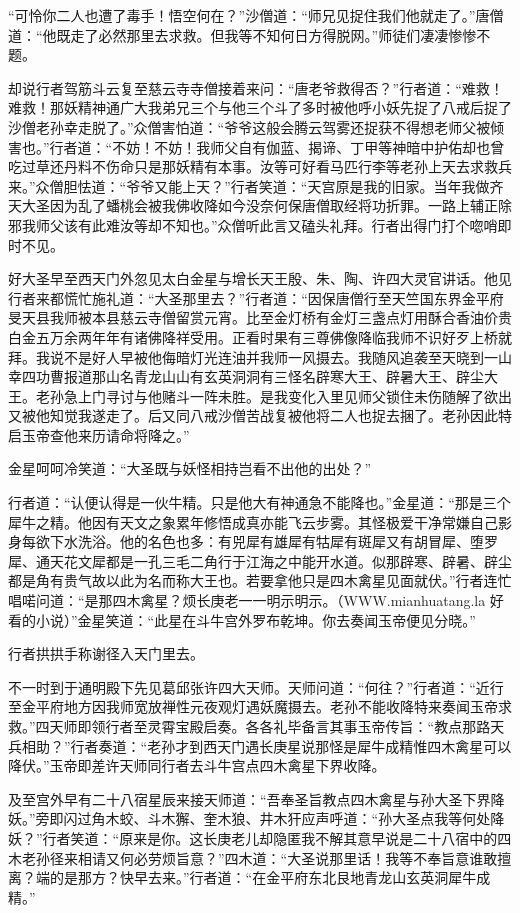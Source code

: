 \documentclass[12pt,UTF8]{ctexbook}
\begin{document}
{	“可怜你二人也遭了毒手！悟空何在？”沙僧道：“师兄见捉住我们他就走了。”唐僧道：“他既走了必然那里去求救。但我等不知何日方得脱网。”师徒们凄凄惨惨不题。
	
	却说行者驾筋斗云复至慈云寺寺僧接着来问：“唐老爷救得否？”行者道：“难救！难救！那妖精神通广大我弟兄三个与他三个斗了多时被他呼小妖先捉了八戒后捉了沙僧老孙幸走脱了。”众僧害怕道：“爷爷这般会腾云驾雾还捉获不得想老师父被倾害也。”行者道：“不妨！不妨！我师父自有伽蓝、揭谛、丁甲等神暗中护佑却也曾吃过草还丹料不伤命只是那妖精有本事。汝等可好看马匹行李等老孙上天去求救兵来。”众僧胆怯道：“爷爷又能上天？”行者笑道：“天宫原是我的旧家。当年我做齐天大圣因为乱了蟠桃会被我佛收降如今没奈何保唐僧取经将功折罪。一路上辅正除邪我师父该有此难汝等却不知也。”众僧听此言又磕头礼拜。行者出得门打个唿哨即时不见。
	
	好大圣早至西天门外忽见太白金星与增长天王殷、朱、陶、许四大灵官讲话。他见行者来都慌忙施礼道：“大圣那里去？”行者道：“因保唐僧行至天竺国东界金平府旻天县我师被本县慈云寺僧留赏元宵。比至金灯桥有金灯三盏点灯用酥合香油价贵白金五万余两年年有诸佛降祥受用。正看时果有三尊佛像降临我师不识好歹上桥就拜。我说不是好人早被他侮暗灯光连油并我师一风摄去。我随风追袭至天晓到一山幸四功曹报道那山名青龙山山有玄英洞洞有三怪名辟寒大王、辟暑大王、辟尘大王。老孙急上门寻讨与他赌斗一阵未胜。是我变化入里见师父锁住未伤随解了欲出又被他知觉我遂走了。后又同八戒沙僧苦战复被他将二人也捉去捆了。老孙因此特启玉帝查他来历请命将降之。”
	
	金星呵呵冷笑道：“大圣既与妖怪相持岂看不出他的出处？”
	
	行者道：“认便认得是一伙牛精。只是他大有神通急不能降也。”金星道：“那是三个犀牛之精。他因有天文之象累年修悟成真亦能飞云步雾。其怪极爱干净常嫌自己影身每欲下水洗浴。他的名色也多：有兕犀有雄犀有牯犀有斑犀又有胡冒犀、堕罗犀、通天花文犀都是一孔三毛二角行于江海之中能开水道。似那辟寒、辟暑、辟尘都是角有贵气故以此为名而称大王也。若要拿他只是四木禽星见面就伏。”行者连忙唱喏问道：“是那四木禽星？烦长庚老一一明示明示。（WWW.mianhuatang.la 好看的小说）”金星笑道：“此星在斗牛宫外罗布乾坤。你去奏闻玉帝便见分晓。”
	
	行者拱拱手称谢径入天门里去。
	
	不一时到于通明殿下先见葛邱张许四大天师。天师问道：“何往？”行者道：“近行至金平府地方因我师宽放禅性元夜观灯遇妖魔摄去。老孙不能收降特来奏闻玉帝求救。”四天师即领行者至灵霄宝殿启奏。各各礼毕备言其事玉帝传旨：“教点那路天兵相助？”行者奏道：“老孙才到西天门遇长庚星说那怪是犀牛成精惟四木禽星可以降伏。”玉帝即差许天师同行者去斗牛宫点四木禽星下界收降。
	
	及至宫外早有二十八宿星辰来接天师道：“吾奉圣旨教点四木禽星与孙大圣下界降妖。”旁即闪过角木蛟、斗木獬、奎木狼、井木犴应声呼道：“孙大圣点我等何处降妖？”行者笑道：“原来是你。这长庚老儿却隐匿我不解其意早说是二十八宿中的四木老孙径来相请又何必劳烦旨意？”四木道：“大圣说那里话！我等不奉旨意谁敢擅离？端的是那方？快早去来。”行者道：“在金平府东北艮地青龙山玄英洞犀牛成精。”
	
}
\end{document}
